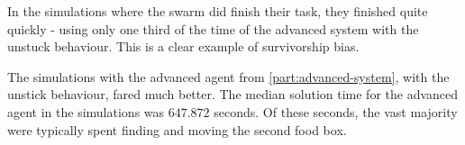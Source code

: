 \documentclass[a4paper]{article}
\begin{document}
In the simulations where the swarm did finish their task, they finished quite quickly - using only one third of the time of the advanced system with the unstuck behaviour.
This is a clear example of survivorship bias.

The simulations with the advanced agent from \ref{part:advanced-system}, with the unstick behaviour, fared much better.
The median solution time for the advanced agent in the simulations was $ 647.872 $ seconds.
Of these seconds, the vast majority were typically spent finding and moving the second food box.



\newpage
{}


\end{document}
